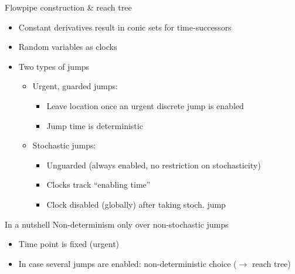 \documentclass[aspectratio=169]{beamer}
\begin{document}
\begin{frame}{Flowpipe construction \& reach tree}

  \begin{minipage}{.7\linewidth}
    \begin{itemize}
      \item Constant derivatives result in conic sets for time-successors
      \item Random variables as clocks
      \item Two types of jumps
      \begin{itemize}
        \item Urgent, guarded jumps:
          \begin{itemize}
            \item Leave location once an urgent discrete jump is enabled
            \item Jump time is deterministic
          \end{itemize}
          \item Stochastic jumps:
          \begin{itemize}
            \item Unguarded (always enabled, no restriction on stochasticity)
            \item Clocks track \enquote{enabling time}
            \item Clock disabled (globally) after taking stoch. jump
          \end{itemize}
      \end{itemize}
    \end{itemize}
  \end{minipage}%
  \begin{minipage}{.3\linewidth}
      
  \end{minipage}

  \begin{result}{In a nutshell}{\linewidth}
    Non-determinism only over non-stochastic jumps
    \begin{itemize}
      \item Time point is fixed (urgent)
      \item In case several jumps are enabled: non-deterministic choice ($\rightarrow$ reach tree)
    \end{itemize}
  \end{result}

\end{frame}

\end{document}
